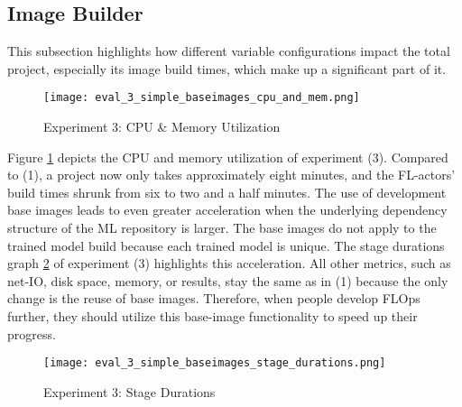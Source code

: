 \subsection{Image Builder}

This subsection highlights how different variable configurations impact the total project, especially its image build times, which make up a significant part of it.

\begin{figure}[H]
    \begin{adjustwidth}{-0.2\paperwidth}{-0.2\paperwidth}
        \centering
        \texttt{[image: eval\_3\_simple\_baseimages\_cpu\_and\_mem.png]}
        \caption{Experiment 3: CPU \& Memory Utilization}
        \label{fig:eval_3_cpu_and_mem}
    \end{adjustwidth}
\end{figure}

Figure \ref{fig:eval_3_cpu_and_mem} depicts the CPU and memory utilization of experiment (3).
Compared to (1), a project now only takes approximately eight minutes, and the FL-actors' build times shrunk from six to two and a half minutes.
The use of development base images leads to even greater acceleration when the underlying dependency structure of the ML repository is larger.
The base images do not apply to the trained model build because each trained model is unique.
The stage durations graph \ref{fig:eval_3_simplest_stage_durations} of experiment (3) highlights this acceleration.
All other metrics, such as net-IO, disk space, memory, or results, stay the same as in (1) because the only change is the reuse of base images.
Therefore, when people develop FLOps further, they should utilize this base-image functionality to speed up their progress.

\begin{figure}[H]
    \begin{adjustwidth}{-0.2\paperwidth}{-0.2\paperwidth}
        \centering
        \texttt{[image: eval\_3\_simple\_baseimages\_stage\_durations.png]}
        \caption{Experiment 3: Stage Durations}
        \label{fig:eval_3_simplest_stage_durations}
    \end{adjustwidth}
\end{figure}

